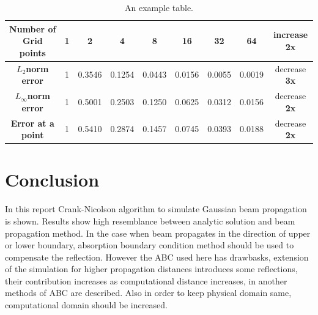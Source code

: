 \documentclass[a4paper]{article}
\begin{document}
	\begin{table}[h!]
		\hspace{-15mm}
		\begin{tabular}{c| c| c| c| c| c| c| c| c} 
			\textbf{ Number of Grid points}& 1 & 2 & 4 & 8 & 16 & 32 & 64 & increase \bf{2x}\\
			\hline
			\textbf{$L_{2}$norm error}& 1 & 0.3546 & 0.1254 & 0.0443 & 0.0156 & 0.0055 & 0.0019& decrease \bf{3x}\\
			\hline
			\textbf{$L_{\infty}$norm error}& 1 & 0.5001 & 0.2503 & 0.1250 & 0.0625 & 0.0312 & 0.0156& decrease \bf{2x}\\
			\hline
			\textbf{Error at a point}& 1 & 0.5410 & 0.2874 & 0.1457 & 0.0745 & 0.0393 & 0.0188& decrease \bf{2x}\\
			
		\end{tabular}
		\caption{\label{tab:Table2}An example table.}
	\end{table}
	
	\newpage
	\section{Conclusion}
	In this report Crank-Nicolson algorithm to simulate Gaussian beam propagation is shown. Results show high resemblance between analytic solution and beam propagation method. In the case when beam propagates in the direction of upper or lower boundary, absorption boundary condition method should be used to compensate the reflection. However the ABC used here has drawbasks, extension of the simulation for higher propagation distances introduces some reflections, their contribution increases as computational distance increases, in \cite{pedrola2015beam} another methods of ABC are described. Also in order to keep physical domain same, computational domain should be increased.
	
	\newpage
	
	
	
	
	\newpage
	
\end{document}

